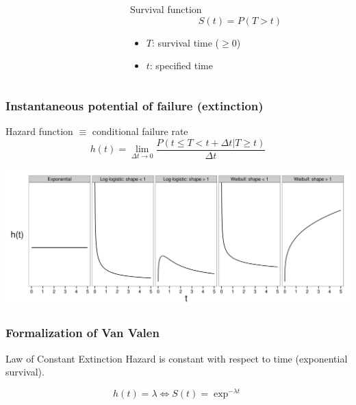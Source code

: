 \documentclass{beamer}
\begin{document}
\begin{frame}
\begin{columns}
\begin{column}{0.5\textwidth}
      \tiny{}
    \end{column}
    \begin{column}{0.5\textwidth}
      \begin{block}{Survival function}
        \[
          S(t) = P(T > t)
        \]

        \begin{itemize}
          \item \(T\): survival time (\(\geq 0\))
          \item \(t\): specified time 
        \end{itemize}
      \end{block}
    \end{column}
  \end{columns}
\end{frame}

\begin{frame}
  \frametitle{Instantaneous potential of failure (extinction)}

  \begin{block}{Hazard function \(\equiv\) conditional failure rate}
    \[
      h(t) = \lim_{\Delta t \to 0} \frac{P(t \leq T < t + \Delta t | T \geq t)}{\Delta t}
    \]
  \end{block}

  \begin{center}
    \includegraphics[height = 0.5\textheight, width = \textwidth, keepaspectratio = true]{figure/hazard}
  \end{center}
\end{frame}

\begin{frame}
  \frametitle{Formalization of Van Valen}

  \begin{block}{Law of Constant Extinction}
    Hazard is constant with respect to time (\alert{exponential survival}).
  \end{block}

  \begin{center}
    \[
      h(t) = \lambda \iff S(t) = \exp^{-\lambda t}
    \]
  \end{center}
\end{frame}
\end{document}
